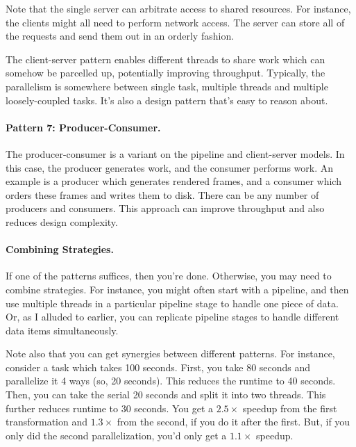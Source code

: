 \documentclass[a4paper]{report}
\begin{document}
Note that the single server can arbitrate access to shared resources.
For instance, the clients might all need to perform network access.
The server can store all of the requests and send them out in an
orderly fashion.

The client-server pattern enables different threads to share work
which can somehow be parcelled up, potentially improving
throughput. Typically, the parallelism is somewhere between single
task, multiple threads and multiple loosely-coupled tasks. It's also a
design pattern that's easy to reason about.

\paragraph{Pattern 7: Producer-Consumer.} The producer-consumer is 
a variant on the pipeline and client-server models. In this case, the
producer generates work, and the consumer performs work. An example is
a producer which generates rendered frames, and a consumer which
orders these frames and writes them to disk. There can be any number
of producers and consumers. This approach can improve throughput
and also reduces design complexity.

\paragraph{Combining Strategies.} If one of the patterns suffices,
then you're done. Otherwise, you may need to combine strategies.
For instance, you might often start with a pipeline, and then 
use multiple threads in a particular pipeline stage to handle one
piece of data. Or, as I alluded to earlier, you can replicate
pipeline stages to handle different data items simultaneously.

Note also that you can get synergies between different patterns.
For instance, consider a task which takes 100 seconds. First, you
take 80 seconds and parallelize it 4 ways (so, 20 seconds). This
reduces the runtime to 40 seconds. Then, you can take the serial 
20 seconds and split it into two threads. This further reduces 
runtime to 30 seconds. You get a $2.5\times$ speedup from the
first transformation and $1.3\times$ from the second, if you do it
after the first. But, if you only did the second parallelization,
you'd only get a $1.1\times$ speedup.
\end{document}
